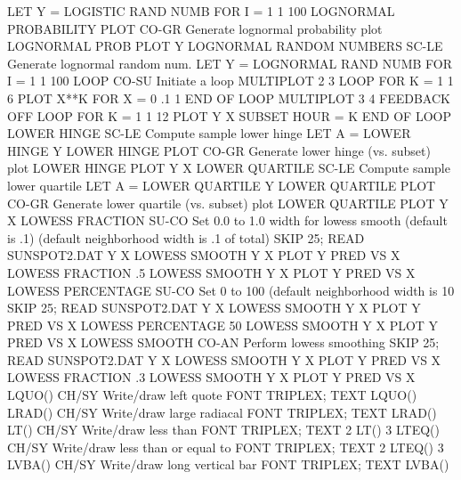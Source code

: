                                   LET Y = LOGISTIC RAND NUMB FOR I = 1 1 100
LOGNORMAL PROBABILITY PLOT  CO-GR Generate lognormal probability plot
                                  LOGNORMAL PROB PLOT Y
LOGNORMAL RANDOM NUMBERS    SC-LE Generate lognormal random num.
                                  LET Y = LOGNORMAL RAND NUMB FOR I = 1 1 100
LOOP                        CO-SU Initiate a loop
                                  MULTIPLOT 2 3
                                  LOOP FOR K = 1 1 6
                                  PLOT X**K FOR X = 0 .1 1
                                  END OF LOOP
                                  MULTIPLOT 3 4
                                  FEEDBACK OFF
                                  LOOP FOR K = 1 1 12
                                  PLOT Y X SUBSET HOUR = K
                                  END OF LOOP
LOWER HINGE                 SC-LE Compute sample lower hinge
                                  LET A = LOWER HINGE Y
LOWER HINGE PLOT            CO-GR Generate lower hinge (vs. subset) plot
                                  LOWER HINGE PLOT Y X
LOWER QUARTILE              SC-LE Compute sample lower quartile
                                  LET A = LOWER QUARTILE Y
LOWER QUARTILE PLOT         CO-GR Generate lower quartile (vs. subset) plot
                                  LOWER QUARTILE PLOT Y X
LOWESS FRACTION             SU-CO Set 0.0 to 1.0 width for lowess smooth
(default is .1)
                                  (default neighborhood width is .1 of total)
                                  SKIP 25; READ SUNSPOT2.DAT Y X
                                  LOWESS SMOOTH Y X
                                  PLOT Y PRED VS X
                                  LOWESS FRACTION .5
                                  LOWESS SMOOTH Y X
                                  PLOT Y PRED VS X
LOWESS PERCENTAGE           SU-CO Set 0 to 100%
                                  (default neighborhood width is 10%
                                  SKIP 25; READ SUNSPOT2.DAT Y X
                                  LOWESS SMOOTH Y X
                                  PLOT Y PRED VS X
                                  LOWESS PERCENTAGE 50
                                  LOWESS SMOOTH Y X
                                  PLOT Y PRED VS X
LOWESS SMOOTH               CO-AN Perform lowess smoothing
                                  SKIP 25; READ SUNSPOT2.DAT Y X
                                  LOWESS SMOOTH Y X
                                  PLOT Y PRED VS X
                                  LOWESS FRACTION .3
                                  LOWESS SMOOTH Y X
                                  PLOT Y PRED VS X
LQUO()                      CH/SY Write/draw left quote
                                  FONT TRIPLEX; TEXT LQUO()
LRAD()                      CH/SY Write/draw large radiacal
                                  FONT TRIPLEX; TEXT LRAD()
LT()                        CH/SY Write/draw less than
                                  FONT TRIPLEX; TEXT 2 LT() 3
LTEQ()                      CH/SY Write/draw less than or equal to
                                  FONT TRIPLEX; TEXT 2 LTEQ() 3
LVBA()                      CH/SY Write/draw long vertical bar
                                  FONT TRIPLEX; TEXT LVBA()
 
